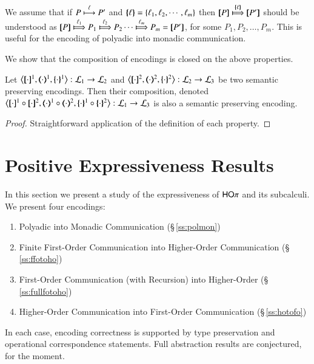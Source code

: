 \begin{remark}\label{r:multilabels}
We  assume that if 
$P \stackrel{\ell}{\longmapsto} P'$ and $\{\!\!\{\ell\}\!\!\} = \{\ell_1, \ell_2,  \cdots, \ell_m\}$ then
$\map{P} \Hby{\mapa{\ell}} \map{P'}$
should be understood as
$\map{P} \Hby{\ell_1} P_1 \Hby{\ell_2} P_2 \cdots \Hby{\ell_m} P_m =  \map{P'}$,
for some
$P_1, P_2, \ldots, P_m$.
This is useful for the encoding of polyadic into monadic communication.
\end{remark}

We show that the composition of encodings is closed on the above properties.

\begin{proposition}
	Let 
	$\enco{\map{\cdot}^{1}, \mapt{\cdot}^{1}, \mapa{\cdot}^{1}}: \tyl{L}_1 \to \tyl{L}_2$
	and 
	$\enco{\map{\cdot}^{2}, \mapt{\cdot}^{2}, \mapa{\cdot}^{2}}: \tyl{L}_2 \to \tyl{L}_3$
	be two semantic preserving encodings.
	Then their composition, denoted 
	$\enco{\map{\cdot}^{1} \circ \map{\cdot}^{2}, \mapt{\cdot}^{1} \circ \mapt{\cdot}^{2}, \mapa{\cdot}^{1}\circ \mapa{\cdot}^{2}}: \tyl{L}_1 \to \tyl{L}_3$
	is also a semantic preserving encoding.
\end{proposition}

\begin{proof}
	Straightforward application of the definition of each property.
\end{proof}

\section{Positive Expressiveness Results}
In this section we present a study of the expressiveness of $\mathsf{HO}\pi$ and its subcalculi. 
We present four encodings:
\begin{enumerate}[1.]
\item Polyadic into Monadic Communication (\S\,\ref{ss:polmon})
\item Finite First-Order Communication into Higher-Order Communication (\S\,\ref{ss:ffotoho})
\item  First-Order Communication (with Recursion) into Higher-Order  (\S\,\ref{ss:fullfotoho})
\item Higher-Order Communication into First-Order Communication (\S\,\ref{ss:hotofo})
\end{enumerate}
In each case, encoding correctness is supported by type preservation and operational correspondence statements.
Full abstraction results are conjectured, for the moment.

